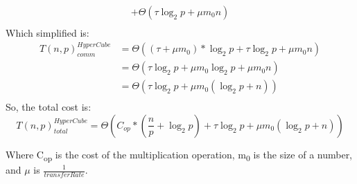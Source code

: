 \documentclass{article}
\begin{document}
\begin{enumerate}[i.]
\begin{multline*}
                + \Theta(\tau \log_{2}{p} + \mu m_{0}{n}) \\
            \end{multline*}
            Which simplified is:
            \begin{align*}
                {T(n,p)}_{comm}^{HyperCube} &= \Theta((\tau + \mu m_{0})*\log_{2}p + \tau \log_{2}{p} + \mu m_{0}{n}) \\
                &= \Theta(\tau \log_{2}p + \mu m_{0}\log_{2}p + \mu m_{0}{n}) \\
                &= \Theta(\tau \log_{2}p + \mu m_{0}(\log_{2}p + {n})) \\
            \end{align*}
            So, the total cost is:
            \begin{equation}
                {T(n,p)}_{total}^{HyperCube} = \Theta(C_{op} * (\frac{n}{p} + \log_{2} p) + \tau \log_{2}p + \mu m_{0}(\log_{2}p + {n}))
            \end{equation}

            Where C\textsubscript{op} is the cost of the multiplication operation, m\textsubscript{0} is the size of a number, and $\mu$ is $\frac{1}{transferRate}$.
    \end{enumerate}
\end{document}
